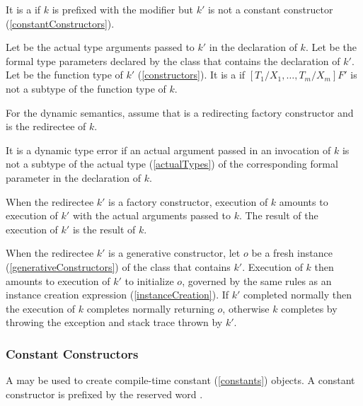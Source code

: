 \documentclass[makeidx]{article}
\begin{document}
\LMHash{}%
It is a  if $k$ is prefixed with the \CONST{} modifier
but $k'$ is not a constant constructor (\ref{constantConstructors}).

\LMHash{}%
Let  be the actual type arguments passed to $k'$
in the declaration of $k$.
Let  be the formal type parameters declared by
the class that contains the declaration of $k'$.
Let  be the function type of $k'$ (\ref{constructors}).
It is a  if $[T_1/X_1, \ldots, T_m/X_m]F'$
is not a subtype of the function type of $k$.


\LMHash{}%
For the dynamic semantics,
assume that  is a redirecting factory constructor
and  is the redirectee of $k$.

\LMHash{}%
It is a dynamic type error if an actual argument passed in an invocation of $k$
is not a subtype of the actual type (\ref{actualTypes})
of the corresponding formal parameter in the declaration of $k$.

\LMHash{}%
When the redirectee $k'$ is a factory constructor,
execution of $k$ amounts to execution of $k'$
with the actual arguments passed to $k$.
The result of the execution of $k'$ is the result of $k$.

\LMHash{}%
When the redirectee $k'$ is a generative constructor,
let $o$ be a fresh instance (\ref{generativeConstructors})
of the class that contains $k'$.
Execution of $k$ then amounts to execution of $k'$ to initialize $o$,
governed by the same rules as an instance creation expression
(\ref{instanceCreation}).
If $k'$ completed normally then the execution of $k$
completes normally returning $o$,
otherwise $k$ completes by throwing the exception and stack trace
thrown by $k'$.


\subsubsection{Constant Constructors}

\LMHash{}%
A 
may be used to create compile-time constant (\ref{constants}) objects.
A constant constructor is prefixed by the reserved word \CONST.
\end{document}
